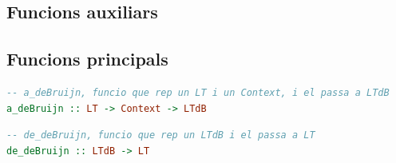 \documentclass[10pt,a4paper]{article}
\begin{document}
\clearpage

\subsection{Funcions auxiliars}

\clearpage

\subsection{Funcions principals}

\begin{lstlisting}[language=Haskell]
-- a_deBruijn, funcio que rep un LT i un Context, i el passa a LTdB
a_deBruijn :: LT -> Context -> LTdB
\end{lstlisting}

\begin{lstlisting}[language=Haskell]
-- de_deBruijn, funcio que rep un LTdB i el passa a LT
de_deBruijn :: LTdB -> LT
\end{lstlisting}
\end{document}
